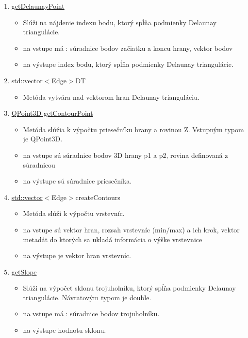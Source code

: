 \documentclass[12pt]{article}
\begin{document}
\begin{enumerate}
\item[] \underline{getDelaunayPoint}
\begin{itemize}
\item Slúži na nájdenie indexu bodu, ktorý spĺňa podmienky Delaunay triangulácie. 
\item na vstupe má : súradnice bodov začiatku a koncu hrany, vektor bodov
\item na výstupe index bodu, ktorý spĺňa podmienky Delaunay triangulácie.
\end{itemize}

\item[] \underline {std::vector}$<${Edge}$>${DT}
\begin{itemize}
\item Metóda vytvára nad vektorom hran Delaunay trianguláciu.
\end{itemize}

\item[] \underline{QPoint3D getContourPoint}
\begin{itemize}
\item Metóda slúžia k výpočtu priesečníku hrany a rovinou Z. Vstupným typom je QPoint3D.
\item na vstupe sú súradnice bodov 3D hrany p1 a p2, rovina definovaná z súradnicou 
\item na výstupe sú súradnice priesečníka.
\end{itemize}

\item[] \underline {std::vector}$<${Edge}$>${createContours}
\begin{itemize}
\item Metóda slúži k výpočtu vrstevníc.
\item na vstupe sú vektor hran, rozsah vrstevníc (min/max) a ich krok, vektor metadát do ktorých sa ukladá informácia o výške vrstevnice
\item na výstupe je vektor hran vrstevníc.
\end{itemize}

\item[] \underline{getSlope}
\begin{itemize}
\item Slúži na výpočet sklonu trojuholníku, ktorý spĺňa podmienky Delaunay triangulácie. Návratovým typom je double.
\item na vstupe má : súradnice bodov trojuholníku.
\item na výstupe hodnotu sklonu.
\end{itemize}


\end{enumerate}
\end{document}
